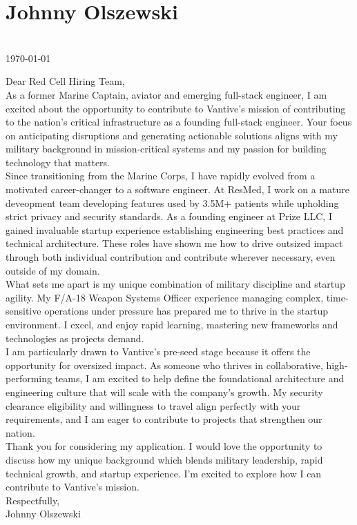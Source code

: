 \documentclass[11pt,letterpaper]{article}
\begin{document}
\begin{minipage}[t]{\linewidth}
    \vspace{1em}
    \section*{\Large{Johnny Olszewski}}
    \vspace{-1em}
    \hrulefill \\[0.5em]

\hfill \today
    
    Dear Red Cell Hiring Team,\\[0.5em]
    
    As a former Marine Captain, aviator and emerging full-stack engineer, I am excited about the opportunity to contribute to Vantive's mission of contributing to the nation's critical infrastructure as a founding full-stack engineer. Your focus on anticipating disruptions and generating actionable solutions aligns with my military background in mission-critical systems and my passion for building technology that matters.\\[0.5em]
    
    Since transitioning from the Marine Corps, I have rapidly evolved from a motivated career-changer to a software engineer. At ResMed, I work on a mature deveopment team developing features used by 3.5M+ patients while upholding strict privacy and security standards. As a founding engineer at Prize LLC, I gained invaluable startup experience establishing engineering best practices and technical architecture. These roles have shown me how to drive outsized impact through both individual contribution and contribute wherever necessary, even outside of my domain.\\[0.5em]
    
    What sets me apart is my unique combination of military discipline and startup agility. My F/A-18 Weapon Systems Officer experience managing complex, time-sensitive operations under pressure has prepared me to thrive in the startup environment. I excel, and enjoy rapid learning, mastering new frameworks and technologies as projects demand.\\[0.5em]
    
    I am particularly drawn to Vantive's pre-seed stage because it offers the opportunity for oversized impact. As someone who thrives in collaborative, high-performing teams, I am excited to help define the foundational architecture and engineering culture that will scale with the company's growth. My security clearance eligibility and willingness to travel align perfectly with your requirements, and I am eager to contribute to projects that strengthen our nation.\\[0.5em]
    
    Thank you for considering my application. I would love the opportunity to discuss how my unique background which blends military leadership, rapid technical growth, and startup experience. I'm excited to explore how I can contribute to Vantive's mission.\\[0.5em]
    
    Respectfully,\\
    Johnny Olszewski
\end{minipage}
\end{document}
